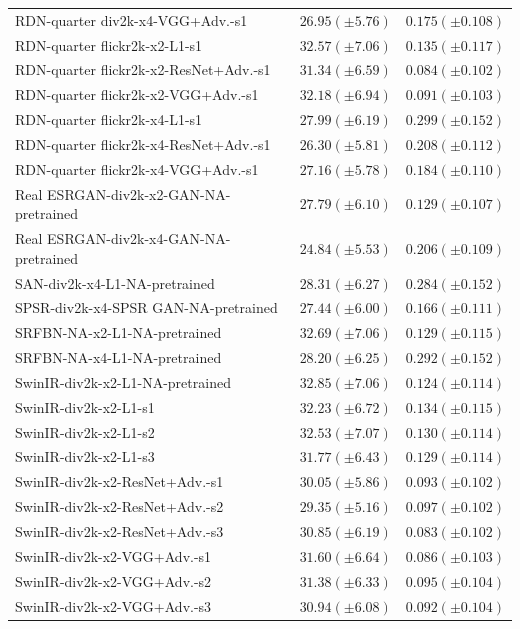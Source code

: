 \documentclass[10pt]{article} %
\begin{document}
\begin{longtable}{| p{} | p{} | p{} |}
RDN-quarter div2k-x4-VGG+Adv.-s1 & $26.95 (\pm 5.76)$ & $0.175 (\pm 0.108)$ \\
RDN-quarter flickr2k-x2-L1-s1 & $32.57 (\pm 7.06)$ & $0.135 (\pm 0.117)$ \\
RDN-quarter flickr2k-x2-ResNet+Adv.-s1 & $31.34 (\pm 6.59)$ & $0.084 (\pm 0.102)$ \\
RDN-quarter flickr2k-x2-VGG+Adv.-s1 & $32.18 (\pm 6.94)$ & $0.091 (\pm 0.103)$ \\
RDN-quarter flickr2k-x4-L1-s1 & $27.99 (\pm 6.19)$ & $0.299 (\pm 0.152)$ \\
RDN-quarter flickr2k-x4-ResNet+Adv.-s1 & $26.30 (\pm 5.81)$ & $0.208 (\pm 0.112)$ \\
RDN-quarter flickr2k-x4-VGG+Adv.-s1 & $27.16 (\pm 5.78)$ & $0.184 (\pm 0.110)$ \\
Real ESRGAN-div2k-x2-GAN-NA-pretrained & $27.79 (\pm 6.10)$ & $0.129 (\pm 0.107)$ \\
Real ESRGAN-div2k-x4-GAN-NA-pretrained & $24.84 (\pm 5.53)$ & $0.206 (\pm 0.109)$ \\
SAN-div2k-x4-L1-NA-pretrained & $28.31 (\pm 6.27)$ & $0.284 (\pm 0.152)$ \\
SPSR-div2k-x4-SPSR GAN-NA-pretrained & $27.44 (\pm 6.00)$ & $0.166 (\pm 0.111)$ \\
SRFBN-NA-x2-L1-NA-pretrained & $32.69 (\pm 7.06)$ & $0.129 (\pm 0.115)$ \\
SRFBN-NA-x4-L1-NA-pretrained & $28.20 (\pm 6.25)$ & $0.292 (\pm 0.152)$ \\
SwinIR-div2k-x2-L1-NA-pretrained & $32.85 (\pm 7.06)$ & $0.124 (\pm 0.114)$ \\
SwinIR-div2k-x2-L1-s1 & $32.23 (\pm 6.72)$ & $0.134 (\pm 0.115)$ \\
SwinIR-div2k-x2-L1-s2 & $32.53 (\pm 7.07)$ & $0.130 (\pm 0.114)$ \\
SwinIR-div2k-x2-L1-s3 & $31.77 (\pm 6.43)$ & $0.129 (\pm 0.114)$ \\
SwinIR-div2k-x2-ResNet+Adv.-s1 & $30.05 (\pm 5.86)$ & $0.093 (\pm 0.102)$ \\
SwinIR-div2k-x2-ResNet+Adv.-s2 & $29.35 (\pm 5.16)$ & $0.097 (\pm 0.102)$ \\
SwinIR-div2k-x2-ResNet+Adv.-s3 & $30.85 (\pm 6.19)$ & $0.083 (\pm 0.102)$ \\
SwinIR-div2k-x2-VGG+Adv.-s1 & $31.60 (\pm 6.64)$ & $0.086 (\pm 0.103)$ \\
SwinIR-div2k-x2-VGG+Adv.-s2 & $31.38 (\pm 6.33)$ & $0.095 (\pm 0.104)$ \\
SwinIR-div2k-x2-VGG+Adv.-s3 & $30.94 (\pm 6.08)$ & $0.092 (\pm 0.104)$ \\

\end{longtable}
\end{document}
